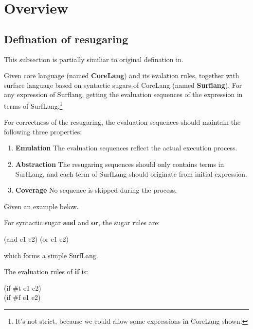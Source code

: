 \section{Overview}
\label{sec2}

\subsection{Defination of resugaring}
This subsection is partially similiar to original defination in\cite{resugaring}.
\begin{Def}[Resugaring]
Given core language (named {\bfseries CoreLang}) and its evalation rules, together with surface language based on syntactic sugars of CoreLang (named {\bfseries Surflang}). For any expression of Surflang, getting the evaluation sequences of the expression in terms of SurfLang.\footnote{It's not strict, because we could allow some expressions in CoreLang shown.}
\end{Def}
For correctness of the resugaring, the evaluation sequences should maintain the following three properties:
\begin{enumerate}
\item {\bfseries Emulation} The evaluation sequences reflect the actual execution process.
\item {\bfseries Abstraction} The resugaring sequences should only contains terms in SurfLang, and each term of SurfLang should originate from initial expression.
\item {\bfseries Coverage} No sequence is skipped during the process.
\end{enumerate}

Given an example below.

For syntactic sugar {\bfseries and} and {\bfseries or}, the sugar rules are:
\begin{Codes}
(and e1 e2)     \hfill (or e1 e2)  
\end{Codes}
which forms a simple SurfLang.

The evaluation rules of {\bfseries if} is:
\begin{Codes}
(if \#t e1 e2)  \\
(if \#f e1 e2)  
\end{Codes}

